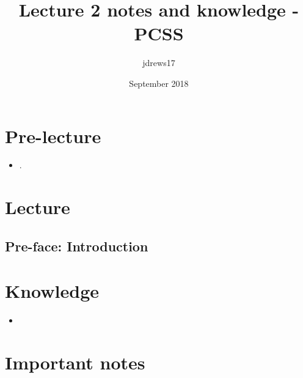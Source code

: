 \documentclass{article}
\title{Lecture 2 notes and knowledge - PCSS}
\author{jdrews17}
\date{September 2018}
\begin{document}
\maketitle
\newpage

\section{Pre-lecture}
\begin{itemize}
  \item .
\end{itemize}

\section{Lecture}
\subsection{Pre-face: Introduction}

\section{Knowledge}
\begin{itemize}
  \item
\end{itemize}

\section{Important notes}
\end{document}
